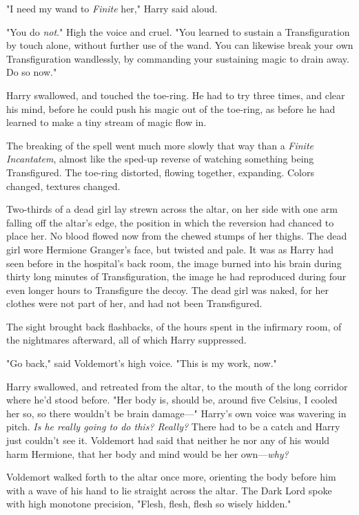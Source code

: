 "I need my wand to \emph{Finite} her," Harry said aloud.

"You do \emph{not}." High the voice and cruel. "You learned to sustain a
Transfiguration by touch alone, without further use of the wand. You can
likewise break your own Transfiguration wandlessly, by commanding your
sustaining magic to drain away. Do so now."

Harry swallowed, and touched the toe-ring. He had to try three times, and clear
his mind, before he could push his magic out of the toe-ring, as before he had
learned to make a tiny stream of magic flow in.

The breaking of the spell went much more slowly that way than a \emph{Finite
Incantatem}, almost like the sped-up reverse of watching something being
Transfigured. The toe-ring distorted, flowing together, expanding. Colors
changed, textures changed.

Two-thirds of a dead girl lay strewn across the altar, on her side with one arm
falling off the altar's edge, the position in which the reversion had chanced
to place her. No blood flowed now from the chewed stumps of her thighs. The
dead girl wore Hermione Granger's face, but twisted and pale. It was as Harry
had seen before in the hospital's back room, the image burned into his brain
during thirty long minutes of Transfiguration, the image he had reproduced
during four even longer hours to Transfigure the decoy. The dead girl was
naked, for her clothes were not part of her, and had not been Transfigured.

The sight brought back flashbacks, of the hours spent in the infirmary room, of
the nightmares afterward, all of which Harry suppressed.

"Go back," said Voldemort's high voice. "This is my work, now."

Harry swallowed, and retreated from the altar, to the mouth of the long
corridor where he'd stood before. "Her body is, should be, around five Celsius,
I cooled her so, so there wouldn't be brain damage---" Harry's own voice was
wavering in pitch. \emph{Is he really going to do this? Really?} There had to
be a catch and Harry just couldn't see it. Voldemort had said that neither he
nor any of his would harm Hermione, that her body and mind would be her
own---\emph{why?}

Voldemort walked forth to the altar once more, orienting the body before him
with a wave of his hand to lie straight across the altar. The Dark Lord spoke
with high monotone precision, "Flesh, flesh, flesh so wisely hidden."

